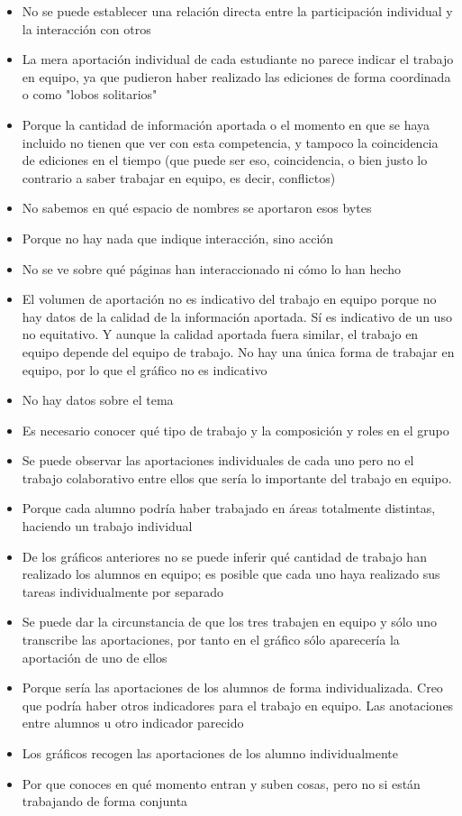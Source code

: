 \begin{itemize}
\item No se puede establecer una relación directa entre la participación individual y la interacción con otros	
\item La mera aportación individual de cada estudiante no parece indicar el trabajo en equipo, ya que pudieron haber realizado las ediciones de forma coordinada o como "lobos solitarios"
\item Porque la cantidad de información aportada o el momento en que se haya incluido no tienen que ver con esta competencia, y tampoco la coincidencia de ediciones en el tiempo (que puede ser eso, coincidencia, o bien justo lo contrario a saber trabajar en equipo, es decir, conflictos)
\item No sabemos en qué espacio de nombres se aportaron esos bytes
\item Porque no hay nada que indique interacción, sino acción
\item No se ve sobre qué páginas han interaccionado ni cómo lo han hecho
\item El volumen de aportación no es indicativo del trabajo en equipo porque no hay datos de la calidad de la información aportada. Sí es indicativo de un uso no equitativo. Y aunque la calidad aportada fuera similar, el trabajo en equipo depende del equipo de trabajo. No hay una única forma de trabajar en equipo, por lo que el gráfico no es indicativo
\item No hay datos sobre el tema
\item Es necesario conocer qué tipo de trabajo y la composición y roles en el grupo
\item Se puede observar las aportaciones individuales de cada uno pero no el trabajo colaborativo entre ellos que sería lo importante del trabajo en equipo.
\item Porque cada alumno podría haber trabajado en áreas totalmente distintas, haciendo un trabajo individual
\item De los gráficos anteriores no se puede inferir qué cantidad de trabajo han realizado los alumnos en equipo; es posible que cada uno haya realizado sus tareas individualmente por separado
\item Se puede dar la circunstancia de que los tres trabajen en equipo y sólo uno transcribe las aportaciones, por tanto en el gráfico sólo aparecería la aportación de uno de ellos
\item Porque sería las aportaciones de los alumnos de forma individualizada. Creo que podría haber otros indicadores para el trabajo en equipo. Las anotaciones entre alumnos u otro indicador parecido
\item Los gráficos recogen las aportaciones de los alumno individualmente
\item Por que conoces en qué momento entran y suben cosas, pero no si están trabajando de forma conjunta
\end{itemize}

